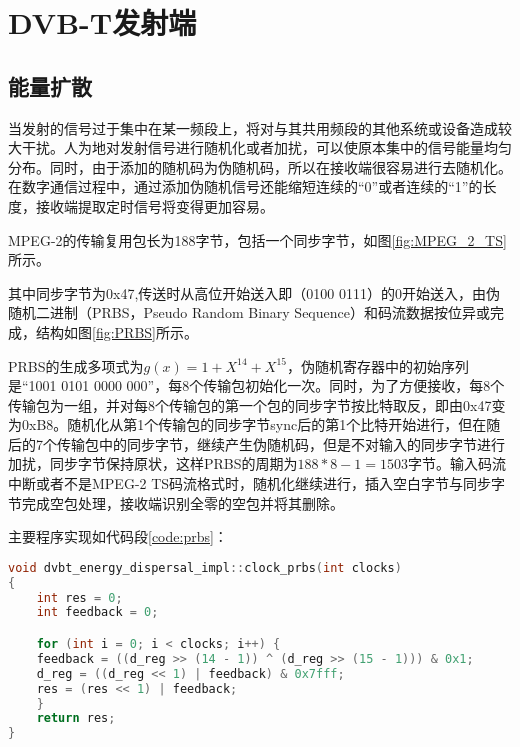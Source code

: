 \chapter{DVB-T发射端}
	\section{能量扩散}
		\par 当发射的信号过于集中在某一频段上，将对与其共用频段的其他系统或设备造成较大干扰。人为地对发射信号进行随机化或者加扰，可以使原本集中的信号能量均匀分布。同时，由于添加的随机码为伪随机码，所以在接收端很容易进行去随机化。在数字通信过程中，通过添加伪随机信号还能缩短连续的“0”或者连续的“1”的长度，接收端提取定时信号将变得更加容易。
		\par MPEG-2的传输复用包长为188字节，包括一个同步字节，如图\ref{fig:MPEG_2_TS}所示。\cite{数字电视DVB标准能量扩散的FPGA设计与实现_肖闽进}
		
		\par 其中同步字节为0x47,传送时从高位开始送入即（0100 0111）的0开始送入，由伪随机二进制（PRBS，Pseudo Random Binary Sequence）和码流数据按位异或完成，结构如图\ref{fig:PRBS}所示。
		
		\par PRBS的生成多项式为$g(x)=1+X^{14}+X^{15}$，伪随机寄存器中的初始序列是“1001 0101 0000 000”，每8个传输包初始化一次。同时，为了方便接收，每8个传输包为一组，并对每8个传输包的第一个包的同步字节按比特取反，即由0x47变为0xB8。随机化从第1个传输包的同步字节sync后的第1个比特开始进行，但在随后的7个传输包中的同步字节，继续产生伪随机码，但是不对输入的同步字节进行加扰，同步字节保持原状，这样PRBS的周期为$188*8-1=1503$字节。输入码流中断或者不是MPEG-2 TS码流格式时，随机化继续进行，插入空白字节与同步字节完成空包处理，接收端识别全零的空包并将其删除。
		\par 主要程序实现如代码段\ref{code:prbs}：
		\begin{lstlisting}[caption = {能量扩散}, label = {code:prbs}, language = C++ ]
void dvbt_energy_dispersal_impl::clock_prbs(int clocks)
{
	int res = 0;
	int feedback = 0;

	for (int i = 0; i < clocks; i++) {
	feedback = ((d_reg >> (14 - 1)) ^ (d_reg >> (15 - 1))) & 0x1;
	d_reg = ((d_reg << 1) | feedback) & 0x7fff;
	res = (res << 1) | feedback;
	}
	return res;
}
		\end{lstlisting}
